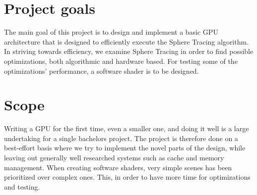 	\section{Project goals}
	
		The main goal of this project is to design and implement a basic GPU
		architecture that is designed to efficiently execute the Sphere Tracing
		algorithm. In striving towards efficiency, we examine Sphere Tracing in
		order to find possible optimizations, both algorithmic and hardware 
		based. For testing some of the optimizations' performance, a software 
		shader is to be designed.
		
	\section{Scope}

		Writing a GPU for the first time, even a smaller one, and doing it well is
		a large undertaking for a single bachelors project. The project is
		therefore done on a best-effort basis where we try to implement the novel
		parts of the design, while leaving out generally well researched systems
		such as cache and memory management. When creating software shaders, very
		simple scenes has been prioritized over complex ones. This, in order to
		have more time for optimizations and testing.



